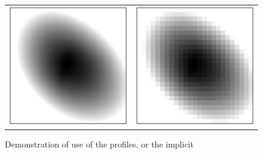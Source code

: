 \documentclass[12pt,pdftex,preprint]{aastex}
\newlength{\figurewidth}
\begin{document}
\begin{figure}
\begin{tabular}{@{}c@{}c@{}}
\includegraphics[width=\figurewidth]{trdemo-08.pdf} &
\includegraphics[width=\figurewidth]{trdemo-09.pdf}
\end{tabular}
\caption{Demonstration of use of the profiles, or the implicit
}
\end{figure}
\end{document}
